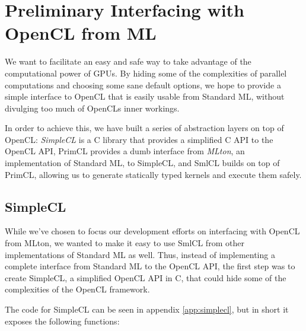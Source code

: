 \section{Preliminary Interfacing with OpenCL from ML}

We want to facilitate an easy and safe way to take advantage of the
computational power of GPUs. By hiding some of the complexities of
parallel computations and choosing some sane default options, we hope
to provide a simple interface to OpenCL that is easily usable from
Standard ML, without divulging too much of OpenCLs inner workings.

In order to achieve this, we have built a series of abstraction layers
on top of OpenCL: \emph{SimpleCL} is a C library that provides a
simplified C API to the OpenCL API, PrimCL provides a dumb interface
from \emph{MLton}, an implementation of Standard ML, to
SimpleCL, and SmlCL builds on top of PrimCL, allowing us to
generate statically typed kernels and execute them safely.

\subsection{SimpleCL}

While we've chosen to focus our development efforts on interfacing
with OpenCL from MLton, we wanted to make it easy to use SmlCL from
other implementations of Standard ML as well. Thus, instead of
implementing a complete interface from Standard ML to the OpenCL API,
the first step was to create SimpleCL, a simplified OpenCL API in C,
that could hide some of the complexities of the OpenCL framework.

The code for SimpleCL can be seen in appendix \ref{app:simplecl}, but
in short it exposes the following functions:


